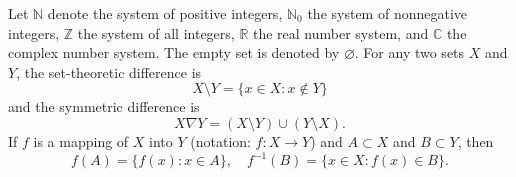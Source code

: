 Let $\mathbb{N}$ denote the system of positive integers, $\mathbb{N}_0$ the system of nonnegative integers, $\mathbb{Z}$ the system of all integers, $\mathbb{R}$ the real number system, and $\mathbb{C}$ the complex number system. The empty set is denoted by $\varnothing$. For any two sets $X$ and $Y$, the set-theoretic difference is
$$X \setminus Y = \{x \in X : x \notin Y\}$$
and the symmetric difference is
$$X \nabla Y = (X \setminus Y) \cup (Y \setminus X).$$
If $f$ is a mapping of $X$ into $Y$ (notation: $f : X \rightarrow Y$) and $A \subset X$ and $B \subset Y$, then
$$f(A) = \{f(x) : x \in A\}, \quad f^{-1}(B) = \{x \in X : f(x) \in B\}.$$
